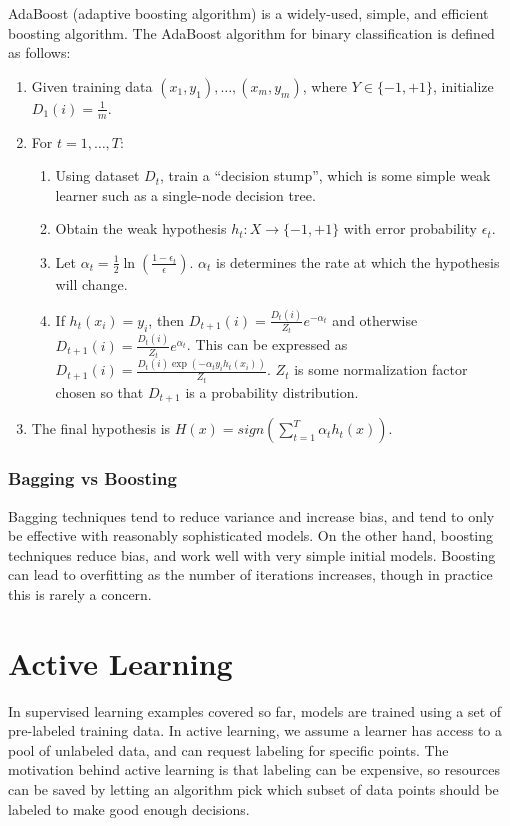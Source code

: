 \documentclass[12pt,titlepage]{article}
\let\stdsection\section
\renewcommand\section{\clearpage\stdsection}
\begin{document}
      AdaBoost (adaptive boosting algorithm) is a widely-used, simple, and efficient boosting algorithm. The AdaBoost algorithm for binary classification is
      defined as follows:
      \begin{enumerate}
        \item Given training data $(x_1, y_1), \dots, (x_m, y_m)$, where $Y \in \{-1, +1\}$, initialize $D_1(i) = \frac{1}{m}$.
        \item For $t = 1, \dots, T$:
          \begin{enumerate}
            \item Using dataset $D_t$, train a ``decision stump'', which is some simple weak learner such as a single-node decision tree.
            \item Obtain the weak hypothesis $h_t: X \rightarrow \{-1, +1\}$ with error probability $\epsilon_t$.
            \item Let $\alpha_t = \frac{1}{2} \ln(\frac{1 - \epsilon_t}{\epsilon})$. $\alpha_t$ is determines the rate at which the hypothesis will change.
            \item If $h_t(x_i) = y_i$, then $D_{t+1}(i) = \frac{D_t(i)}{Z_t}e^{-\alpha_t}$ and otherwise $D_{t+1}(i) = \frac{D_t(i)}{Z_t}e^{\alpha_t}$.
              This can be expressed as $D_{t+1}(i) = \frac{D_t(i)\exp(-\alpha_t y_i h_t(x_i))}{Z_t}$. $Z_t$ is some normalization factor chosen so
              that $D_{t+1}$ is a probability distribution.
          \end{enumerate}
        \item The final hypothesis is $H(x) = sign(\sum_{t=1}^T \alpha_t h_t(x))$.
      \end{enumerate}

      \subsubsection{Bagging vs Boosting}
        Bagging techniques tend to reduce variance and increase bias, and tend to only be effective with reasonably sophisticated models. On the other hand,
        boosting techniques reduce bias, and work well with very simple initial models. Boosting can lead to overfitting as the number of iterations increases,
        though in practice this is rarely a concern.

  \section{Active Learning}
    In supervised learning examples covered so far, models are trained using a set of pre-labeled training data. In active learning, we assume a learner has
    access to a pool of unlabeled data, and can request labeling for specific points. The motivation behind active learning is that labeling can be expensive,
    so resources can be saved by letting an algorithm pick which subset of data points should be labeled to make good enough decisions.
\end{document}
